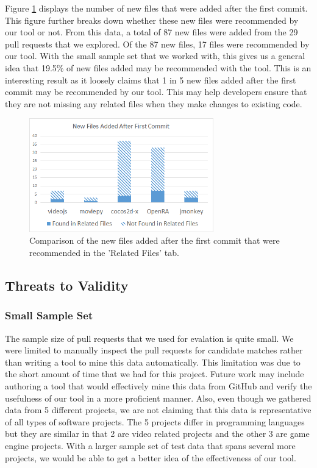 Figure \ref{fig:newFilesAfterFirstCommit} displays the number of new files that were added after the first commit. This figure further breaks down whether these new files were recommended by our tool or not. From this data, a total of 87 new files were added from the 29 pull requests that we explored. Of the 87 new files, 17 files were recommended by our tool. With the small sample set that we worked with, this gives us a general idea that 19.5\% of new files added may be recommended with the tool. This is an interesting result as it loosely claims that 1 in 5 new files added after the first commit may be recommended by our tool. This may help developers ensure that they are not missing any related files when they make changes to existing code.

\begin{figure}[h!]
\includegraphics[width=8cm]{NewFilesAfterFirstCommit}
\caption{Comparison of the new files added after the first commit that were recommended in the 'Related Files' tab.}
\label{fig:newFilesAfterFirstCommit}
\end{figure}

\subsection{Threats to Validity}

\subsubsection{Small Sample Set}

The sample size of pull requests that we used for evalation is quite small. We were limited to manually inspect the pull requests for candidate matches rather than writing a tool to mine this data automatically. This limitation was due to the short amount of time that we had for this project. Future work may include authoring a tool that would effectively mine this data from GitHub and verify the usefulness of our tool in a more proficient manner. Also, even though we gathered data from 5 different projects, we are not claiming that this data is representative of all types of software projects. The 5 projects differ in programming languages but they are similar in that 2 are video related projects and the other 3 are game engine projects. With a larger sample set of test data that spans several more projects, we would be able to get a better idea of the effectiveness of our tool.

